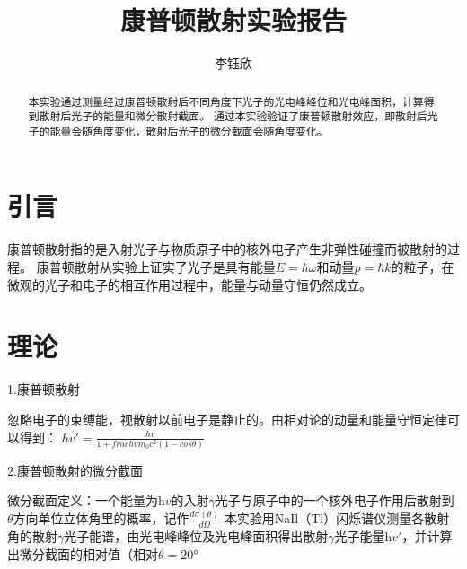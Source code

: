 \documentclass[font=default]{mpltx}
\makeatletter
\newcommand\releasedate{%
    \href{https://github.com/CastleStar14654/PKUMpLtX/releases/tag/\mpltx@fileversion}%
        {\mpltx@filedate, \mpltx@fileversion}}
\makeatother
\begin{document}
\title{康普顿散射实验报告} %
\author{李钰欣} %
\date{}
\begin{abstract}
  本实验通过测量经过康普顿散射后不同角度下光子的光电峰峰位和光电峰面积，计算得到散射后光子的能量和微分散射截面。
  通过本实验验证了康普顿散射效应，即散射后光子的能量会随角度变化，散射后光子的微分截面会随角度变化。
\end{abstract}

\maketitle

\section{引言}

康普顿散射指的是入射光子与物质原子中的核外电子产生非弹性碰撞而被散射的过程。
康普顿散射从实验上证实了光子是具有能量$E = \hbar \omega$和动量$p = \hbar k$的粒子，在微观的光子和电子的相互作用过程中，能量与动量守恒仍然成立。

 
\section{理论}\label{sec:theory}
1.康普顿散射

忽略电子的束缚能，视散射以前电子是静止的。由相对论的动量和能量守恒定律可以得到：
$h \mathit{v}' = \frac{h \mathit{v}}{1+ frac{h \mathit{v}}{m_0 c^2}(1-cos \theta)}$

2.康普顿散射的微分截面

微分截面定义：一个能量为h$v$的入射$\gamma$光子与原子中的一个核外电子作用后散射到$\theta$方向单位立体角里的概率，记作$\frac{d \sigma (\theta)}{d \Omega}$
本实验用NaIl（Tl）闪烁谱仪测量各散射角的散射$\gamma$光子能谱，由光电峰峰位及光电峰面积得出散射$\gamma$光子能量h$v'$，并计算出微分截面的相对值（相对$\theta = 20$°
\end{document}
